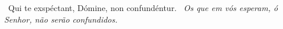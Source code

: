\begin{paracol}{2}
  \Antiphona~Qui te exspéctant, Dómine, non confundéntur.
  \switchcolumn
  \Antiphona~\emph{Os que em vós esperam, ó Senhor, não serão confundidos.}
\end{paracol}